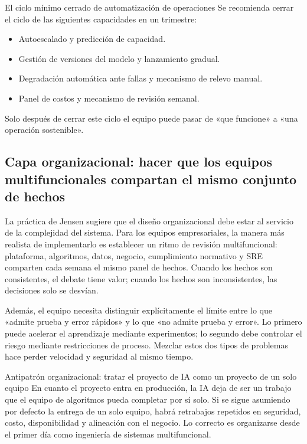 \documentclass[a4paper]{article}
\begin{document}
\begin{knowledgebox}{El ciclo mínimo cerrado de automatización de operaciones}
Se recomienda cerrar el ciclo de las siguientes capacidades en un trimestre:
\begin{itemize}
    \item Autoescalado y predicción de capacidad.
    \item Gestión de versiones del modelo y lanzamiento gradual.
    \item Degradación automática ante fallas y mecanismo de relevo manual.
    \item Panel de costos y mecanismo de revisión semanal.
\end{itemize}
Solo después de cerrar este ciclo el equipo puede pasar de «que funcione» a «una operación sostenible».
\end{knowledgebox}

\subsection{Capa organizacional: hacer que los equipos multifuncionales compartan el mismo conjunto de hechos}

La práctica de Jensen sugiere que el diseño organizacional debe estar al servicio de la complejidad del sistema. Para los equipos empresariales, la manera más realista de implementarlo es establecer un ritmo de revisión multifuncional: plataforma, algoritmos, datos, negocio, cumplimiento normativo y SRE comparten cada semana el mismo panel de hechos. Cuando los hechos son consistentes, el debate tiene valor; cuando los hechos son inconsistentes, las decisiones solo se desvían.

Además, el equipo necesita distinguir explícitamente el límite entre lo que «admite prueba y error rápidos» y lo que «no admite prueba y error». Lo primero puede acelerar el aprendizaje mediante experimentos; lo segundo debe controlar el riesgo mediante restricciones de proceso. Mezclar estos dos tipos de problemas hace perder velocidad y seguridad al mismo tiempo.

\begin{warningbox}{Antipatrón organizacional: tratar el proyecto de IA como un proyecto de un solo equipo}
En cuanto el proyecto entra en producción, la IA deja de ser un trabajo que el equipo de algoritmos pueda completar por sí solo. Si se sigue asumiendo por defecto la entrega de un solo equipo, habrá retrabajos repetidos en seguridad, costo, disponibilidad y alineación con el negocio. Lo correcto es organizarse desde el primer día como ingeniería de sistemas multifuncional.
\end{warningbox}
\end{document}
